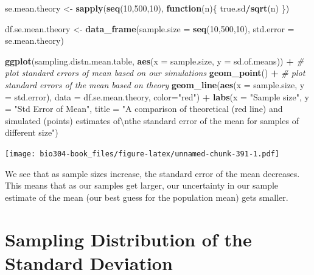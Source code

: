\documentclass[]{book}
\newenvironment{Shaded}{\begin{snugshade}}{\end{snugshade}}
\newcommand{\CharTok}[1]{\textcolor[rgb]{0.31,0.60,0.02}{#1}}
\newcommand{\CommentTok}[1]{\textcolor[rgb]{0.56,0.35,0.01}{\textit{#1}}}
\newcommand{\ControlFlowTok}[1]{\textcolor[rgb]{0.13,0.29,0.53}{\textbf{#1}}}
\newcommand{\DataTypeTok}[1]{\textcolor[rgb]{0.13,0.29,0.53}{#1}}
\newcommand{\DecValTok}[1]{\textcolor[rgb]{0.00,0.00,0.81}{#1}}
\newcommand{\KeywordTok}[1]{\textcolor[rgb]{0.13,0.29,0.53}{\textbf{#1}}}
\newcommand{\NormalTok}[1]{#1}
\newcommand{\OperatorTok}[1]{\textcolor[rgb]{0.81,0.36,0.00}{\textbf{#1}}}
\newcommand{\StringTok}[1]{\textcolor[rgb]{0.31,0.60,0.02}{#1}}
\theoremstyle{definition}
\theoremstyle{definition}
\theoremstyle{definition}
\theoremstyle{remark}
\begin{document}
\begin{Shaded}
\begin{Highlighting}[]
\NormalTok{se.mean.theory <-}\StringTok{ }\KeywordTok{sapply}\NormalTok{(}\KeywordTok{seq}\NormalTok{(}\DecValTok{10}\NormalTok{,}\DecValTok{500}\NormalTok{,}\DecValTok{10}\NormalTok{), }
                         \ControlFlowTok{function}\NormalTok{(n)\{ true.sd}\OperatorTok{/}\KeywordTok{sqrt}\NormalTok{(n) \})}

\NormalTok{df.se.mean.theory <-}\StringTok{ }\KeywordTok{data_frame}\NormalTok{(}\DataTypeTok{sample.size =} \KeywordTok{seq}\NormalTok{(}\DecValTok{10}\NormalTok{,}\DecValTok{500}\NormalTok{,}\DecValTok{10}\NormalTok{),}
                                \DataTypeTok{std.error =}\NormalTok{ se.mean.theory)}

\KeywordTok{ggplot}\NormalTok{(sampling.distn.mean.table, }\KeywordTok{aes}\NormalTok{(}\DataTypeTok{x =}\NormalTok{ sample.size, }\DataTypeTok{y =}\NormalTok{ sd.of.means)) }\OperatorTok{+}
\StringTok{   }\CommentTok{# plot standard errors of mean based on our simulations}
\StringTok{  }\KeywordTok{geom_point}\NormalTok{() }\OperatorTok{+}\StringTok{  }
\StringTok{  }\CommentTok{# plot standard errors of the mean based on theory}
\StringTok{  }\KeywordTok{geom_line}\NormalTok{(}\KeywordTok{aes}\NormalTok{(}\DataTypeTok{x =}\NormalTok{ sample.size, }\DataTypeTok{y =}\NormalTok{ std.error), }\DataTypeTok{data =}\NormalTok{ df.se.mean.theory, }\DataTypeTok{color=}\StringTok{"red"}\NormalTok{) }\OperatorTok{+}
\StringTok{  }\KeywordTok{labs}\NormalTok{(}\DataTypeTok{x =} \StringTok{"Sample size"}\NormalTok{, }\DataTypeTok{y =} \StringTok{"Std Error of Mean"}\NormalTok{,}
       \DataTypeTok{title =} \StringTok{"A comparison of theoretical (red line) and simulated (points) estimates of}\CharTok{\textbackslash{}n}\StringTok{the standard error of the mean for samples of different size"}\NormalTok{)}
\end{Highlighting}
\end{Shaded}

\texttt{[image: bio304-book\_files/figure-latex/unnamed-chunk-391-1.pdf]}

We see that as sample sizes increase, the standard error of the mean
decreases. This means that as our samples get larger, our uncertainty in
our sample estimate of the mean (our best guess for the population mean)
gets smaller.

\hypertarget{sampling-distribution-of-the-standard-deviation}{%
\section{Sampling Distribution of the Standard
Deviation}\label{sampling-distribution-of-the-standard-deviation}}
\end{document}

